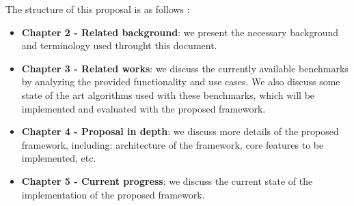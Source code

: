 The structure of this proposal is as follows :

\begin{itemize}
	\item \textbf{Chapter 2 - Related background}: we present the necessary background and
		  terminology used throught this document.
	\item \textbf{Chapter 3 - Related works}: we discuss the currently available benchmarks by
		  analyzing the provided functionality and use cases. We also discuss some
		  state of the art algorithms used with these benchmarks, which will be
		  implemented and evaluated with the proposed framework.
	\item \textbf{Chapter 4 - Proposal in depth}: we discuss more details of the proposed framework,
		  including: architecture of the framework, core features to be implemented, etc.
	\item \textbf{Chapter 5 - Current progress}: we discuss the current state of the implementation
		  of the proposed framework.
\end{itemize}